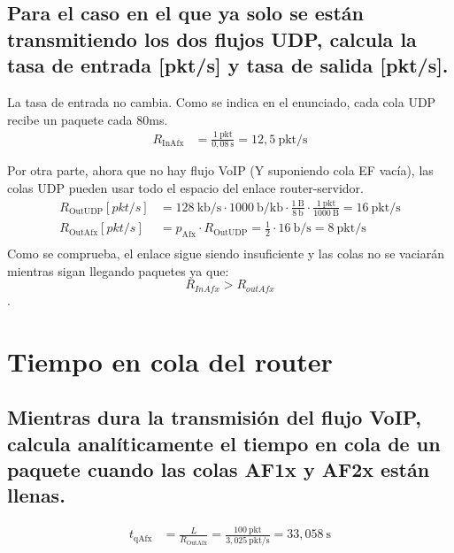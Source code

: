 \vspace{0,3cm}

\subsection{Para el caso en el que ya solo se están transmitiendo los dos flujos UDP, calcula la tasa de entrada [pkt/s] y
tasa de salida [pkt/s].}
La tasa de entrada no cambia. Como se indica en el enunciado, cada cola UDP recibe un paquete cada 80ms. \\
\[
    \begin{aligned}
        R_{\text{InAfx}} &= \frac{1~\text{pkt}}{0,08~\text{s}} = 12,5~\text{pkt/s} \\ \\
    \end{aligned}
\]
Por otra parte, ahora que no hay flujo VoIP (Y suponiendo cola EF vacía), las colas UDP pueden usar todo
el espacio del enlace router-servidor.
\[
    \begin{aligned}
        R_{\text{OutUDP}}[pkt/s] &= 128~\text{kb/s} \cdot 1000~\text{b/kb} \cdot \frac{1~\text{B}}{8~\text{b}} \cdot \frac{1~\text{pkt}}{1000~\text{B}} = 16~\text{pkt/s} \\
		R_{\text{OutAfx}}[pkt/s] &= p_{\text{Afx}} \cdot R_{\text{OutUDP}} = \frac{1}{2} \cdot 16~\text{b/s} = 8~\text{pkt/s} \\
    \end{aligned}
\]
Como se comprueba, el enlace sigue siendo insuficiente y las colas no se vaciarán mientras sigan llegando paquetes
ya que: \[R_{InAfx} > R_{outAfx}\].

\vspace{1cm}

\section{Tiempo en cola del router}

\subsection{Mientras dura la transmisión del flujo VoIP, calcula analíticamente el tiempo en cola de un paquete cuando
las colas AF1x y AF2x están llenas.}
\[
    \begin{aligned}
        t_{\text{qAfx}} &= \frac{L}{R_{\text{OutAfx}}} = \frac{100~\text{pkt}}{3,025~\text{pkt/s}}= 33,058~\text{s} \\
    \end{aligned}
\]

